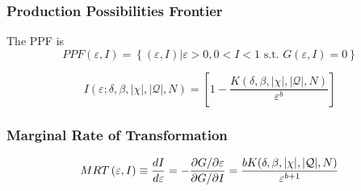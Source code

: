 \begin{frame}[allowframebreaks]%
\frametitle{Production Possibilities Frontier}
The PPF is
\begin{equation}
PPF\left( \varepsilon ,I\right) =\left\{ \left( \varepsilon ,I\right)
\left\vert \varepsilon >0,0<I<1\text{ s.t. }G(\varepsilon ,I)=0\right. \right\}
\end{equation}%

\begin{equation}
I\left( \varepsilon ;\delta ,\beta ,|\chi |,|\mathcal{Q}|,N\right) =\left[ 1-%
\frac{K(\delta ,\beta ,|\chi |,|\mathcal{Q}|,N)}{\varepsilon ^{b}}\right]
\end{equation}%

\end{frame}%
%

\begin{frame}[allowframebreaks]%
\frametitle{Marginal Rate of Transformation}
\begin{equation}
MRT\left( \varepsilon ,I\right) \equiv \frac{dI}{d\varepsilon } = -\frac{\partial G/\partial \varepsilon
}{\partial G/\partial I}=\frac{bK(\delta ,\beta ,|\chi |,|\mathcal{Q}|,N)}{%
\varepsilon ^{b+1}}%
\end{equation}

\end{frame}%
%

